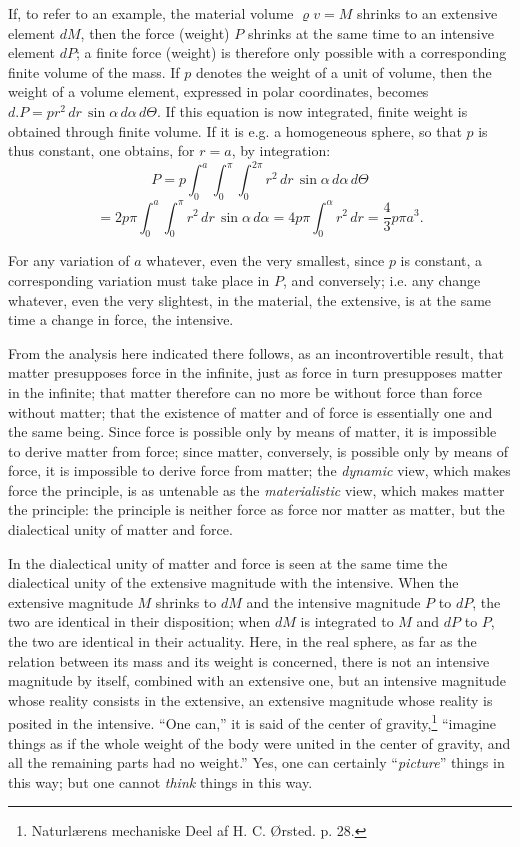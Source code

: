 \documentclass[12pt,a4paper,openany]{book}
\newcommand{\opage}[1]{\marginnote{\footnotesize\textit{[#1]}}}
\begin{document}
If, to refer to an example, the material
volume $\varrho v = M$ shrinks to an extensive element $dM$, then
the force (weight) $P$ shrinks at the same time to an intensive
element $dP$; a finite force (weight) is therefore only
possible with a corresponding finite volume of the mass. If $p$ denotes the weight of a unit of volume, then the weight of a
volume element, expressed in polar coordinates, becomes $d.P = p r^{2}\,dr\,\sin\alpha\,d\alpha\,d\Theta$. If this equation is now integrated, finite
weight is obtained through finite volume. If it is e.g. a
homogeneous sphere, so that $p$ is thus constant, one obtains,
for $r=a$, by integration:
\[ P=p\int_{0}^{a}\int_{0}^{\pi}\int_{0}^{2\pi} r^{2}\,dr\,\sin\alpha\,d\alpha\,d\Theta \]
\[ =2p\pi\int_{0}^{a}\int_{0}^{\pi} r^{2}\,dr\,\sin\alpha\,d\alpha=4p\pi\int_{0}^{\alpha} r^{2}\,dr=\frac{4}{3}p\pi a^{3}. \]

For any variation of $a$ whatever, even the very smallest, since $p$ is constant, a corresponding variation must take
place in $P$, and conversely; i.e. any change whatever, even the very slightest,
in the material, the extensive, is at the same time
a change in force, the intensive.

\setcounter{footnote}{0}%
\opage{129}From the analysis here indicated there follows, as an incontrovertible result, that matter presupposes force in the infinite, just as force in turn presupposes matter in the infinite; that matter therefore can no more be without force than force without matter; that the existence of matter and of force is essentially one and the same being. Since force is possible only by means of matter, it is impossible to derive matter from force; since matter, conversely, is possible only by means of force, it is impossible to derive force from matter; the \emph{dynamic} view, which makes force the principle, is as untenable as the \emph{materialistic} view, which makes matter the principle: the principle is neither force as force nor matter as matter, but the dialectical unity of matter and force.

In the dialectical unity of matter and force is seen at the same time the dialectical unity of the extensive magnitude with the intensive. When the extensive magnitude $M$ shrinks to $dM$ and the intensive magnitude $P$ to $dP$, the two are identical in their disposition; when $dM$ is integrated to $M$ and $dP$ to $P$, the two are identical in their actuality. Here, in the real sphere, as far as the relation between its mass and its weight is concerned, there is not an intensive magnitude by itself, combined with an extensive one, but an intensive magnitude whose reality consists in the extensive, an extensive magnitude whose reality is posited in the intensive. ``One can,'' it is said of the center of gravity,\footnote[1]{Naturlærens mechaniske Deel af H. C. Ørsted. p. 28.}
``imagine things as if the whole weight of the body were united in the center of gravity, and all the remaining parts had no weight.'' Yes, one can certainly ``\emph{picture}'' things in this way; but one cannot \emph{think} things in this way.
\end{document}
